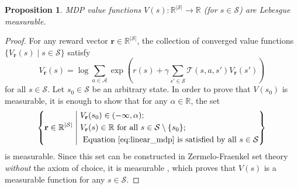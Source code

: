 \documentclass{mpaper}
\newtheorem{proposition}[theorem]{Proposition}
\newcommand{\V}{V_{\mathbf{r}}}
\begin{document}
\begin{proposition} \label{thm:measurability}
  MDP value functions $V(s) : \mathbb{R}^{|\mathcal{S}|} \to \mathbb{R}$ (for $s
  \in \mathcal{S}$) are Lebesgue measurable.
\end{proposition}
\begin{proof}
  For any reward vector $\mathbf{r} \in \mathbb{R}^{|\mathcal{S}|}$, the
  collection of converged value functions $\{ \V(s) \mid s \in
  \mathcal{S} \}$ satisfy
  \begin{equation} \label{eq:linear_mdp}
    \V(s) = \log \sum_{a \in \mathcal{A}}
    \exp\left( r(s) + \gamma\sum_{s' \in \mathcal{S}} \mathcal{T}(s, a,
      s')\V(s') \right)
  \end{equation}
  for all $s \in \mathcal{S}$. Let $s_0 \in \mathcal{S}$ be an arbitrary state.
  In order to prove that $V(s_0)$ is measurable, it is enough to show that for
  any $\alpha \in \mathbb{R}$, the set
  \[
    \left\{ \mathbf{r} \in \mathbb{R}^{|\mathcal{S}|} \; \middle|
    \begin{aligned}
      \;&\V(s_0) \in (-\infty, \alpha); \\
      \;&\V(s) \in \mathbb{R} \text{ for all } s \in \mathcal{S} \setminus \{ s_0 \}; \\
      \;&\text{ Equation \ref{eq:linear_mdp} is satisfied by all } s \in
      \mathcal{S}
    \end{aligned}
    \right\}
  \]
  is measurable. Since this set can be constructed in Zermelo-Fraenkel set
  theory \emph{without} the axiom of choice, it is measurable
  \cite{herrlich2006axiom}, which proves that $V(s)$ is a measurable function
  for any $s \in \mathcal{S}$.
\end{proof}
\end{document}
